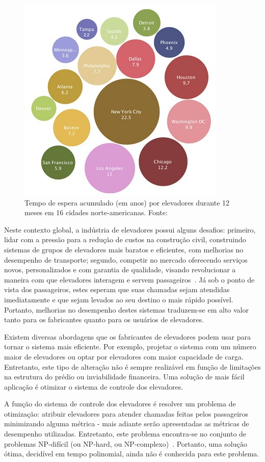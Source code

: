\begin{figure}[htb!]
\centering\includegraphics{img/time-cost.jpg}
\caption{\label{fig:fig1}Tempo de espera acumulado (em anos) por elevadores
durante 12 meses em 16 cidades norte-americanas. Fonte:~\cite{IBM10}}
\end{figure}

Neste contexto global, a indústria de elevadores possui alguns desafios:
primeiro, lidar com a pressão para a redução de custos na construção civil,
construindo sistemas de grupos de elevadores mais baratos e eficientes, com
melhorias no desempenho de transporte; segundo, competir no mercado oferecendo
serviços novos, personalizados e com garantia de qualidade, visando revolucionar
a maneira com que elevadores interagem e servem
passageiros~\cite{KOEHLEROTTIGER02}. Já sob o ponto de vista dos passageiros,
estes esperam que suas chamadas sejam atendidas imediatamente e que sejam
levados ao seu destino o mais rápido possível. Portanto, melhorias no desempenho
destes sistemas traduzem-se em alto valor tanto para os fabricantes quanto para
os usuários de elevadores.

Existem diversas abordagens que os fabricantes de elevadores podem usar para
tornar o sistema mais eficiente. Por exemplo, projetar o sistema com um número
maior de elevadores ou optar por elevadores com maior capacidade de carga.
Entretanto, este tipo de alteração não é sempre realizável em função de
limitações na estrutura do prédio ou inviabilidade financeira. Uma solução de
mais fácil aplicação é otimizar o sistema de controle dos elevadores.

A função do sistema de controle dos elevadores é resolver um problema de
otimização: atribuir elevadores para atender chamadas feitas pelos passageiros
minimizando alguma métrica - mais adiante serão apresentadas as métricas de
desempenho utilizadas. Entretanto, este problema encontra-se no conjunto de
problemas NP-difícil (ou NP-hard, ou NP-complexo)~\cite{SeKo99}. Portanto, uma
solução ótima, decidível em tempo polinomial, ainda não é conhecida para este
problema.

